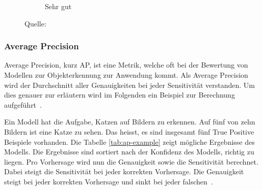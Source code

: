 \begin{figure}[h!]
\begin{subfigure}[b]{0.3\linewidth}
        \caption*{Sehr gut} 
        \vspace{2ex}
    \end{subfigure}
    
    \caption*{Quelle: \textcite{IoU}}
\end{figure}

\subsubsection{Average Precision}
\label{chap:ap}

Average Precision, kurz AP, ist eine Metrik, welche oft bei der Bewertung von Modellen zur Objekterkennung zur Anwendung kommt. Als Average Precision wird der Durchschnitt aller Genauigkeiten bei jeder Sensitivität verstanden. Um dies genauer zur erläutern wird im Folgenden ein Beispiel zur Berechnung aufgeführt~\autocite{AP}.

Ein Modell hat die Aufgabe, Katzen auf Bildern zu erkennen. Auf fünf von zehn Bildern ist eine Katze zu sehen. Das heisst, es sind insgesamt fünf True Positive Beispiele vorhanden. Die Tabelle \ref{tab:ap-example} zeigt mögliche Ergebnisse des Modells. Die Ergebnisse sind sortiert nach der Konfidenz des Modells, richtig zu liegen. Pro Vorhersage wird nun die Genauigkeit sowie die Sensitivität berechnet. Dabei steigt die Sensitivität bei jeder korrekten Vorhersage. Die Genauigkeit steigt bei jeder korrekten Vorhersage und sinkt bei jeder falschen~\autocite{AP}.

